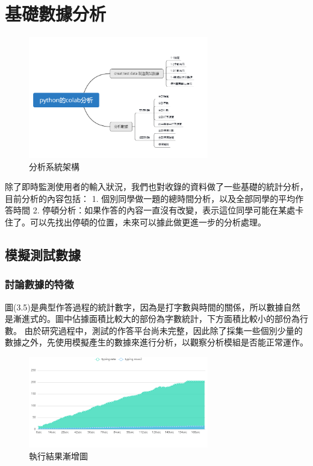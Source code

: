\section{基礎數據分析}
	\begin{figure}[H] %
	\centering %
	\includegraphics[width=0.7\textwidth]{2.png} %
	\caption{分析系統架構} %
	\label{Fig.3.4} %
	\end{figure}
除了即時監測使用者的輸入狀況，我們也對收錄的資料做了一些基礎的統計分析，目前分析的內容包括：
1. 個別同學做一題的總時間分析，以及全部同學的平均作答時間
2. 停頓分析：如果作答的內容一直沒有改變，表示這位同學可能在某處卡住了。可以先找出停頓的位置，未來可以據此做更進一步的分析處理。

\subsection{模擬測試數據}
\subsubsection{討論數據的特徵}
圖(3.5)是典型作答過程的統計數字，因為是打字數與時間的關係，所以數據自然是漸進式的。圖中佔據面積比較大的部份為字數統計，下方面積比較小的部份為行數。
由於研究過程中，測試的作答平台尚未完整，因此除了採集一些個別少量的數據之外，先使用模擬產生的數據來進行分析，以觀察分析模組是否能正常運作。
	\begin{figure}[H] %
	\centering %
	\includegraphics[width=0.7\textwidth]{4.png} %
	\caption{執行結果漸增圖} %
	\label{Fig.3.5} %
	\end{figure}

